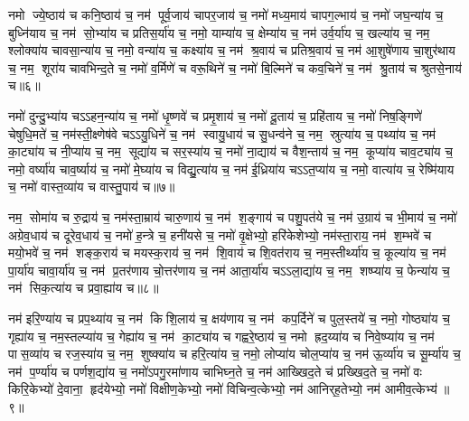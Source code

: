 नमो ज्ये॒ष्ठाय॑ च कनि॒ष्ठाय॑ च॒ नम॑ पूर्व॒जाय॑ चापर॒जाय॑ च॒ नमो॑ मध्य॒माय॑ चापग॒ल्भाय॑ च॒ नमो॑ जघ॒न्या॑य च॒ बुध्नि॑याय च॒ नम॑ सो॒भ्या॑य च प्रतिस॒र्या॑य च॒ नमो॒ याम्या॑य च॒ क्षेम्या॑य च॒ नम॑ उर्व॒र्या॑य च॒ खल्या॑य च॒ नम॒ श्लोक्या॑य चावसा॒न्या॑य च॒ नमो॒ वन्या॑य च॒ कक्ष्या॑य च॒ नम॑ श्र॒वाय॑ च प्रतिश्र॒वाय॑ च॒ नम॑ आ॒शुषे॑णाय चा॒शुर॑थाय च॒ नम॒ शूरा॑य चावभिन्द॒ते च॒ नमो॑ व॒र्मिणे॑ च वरू॒थिने॑ च॒ नमो॑ बि॒ल्मिने॑ च कव॒चिने॑ च॒ नम॑ श्रु॒ताय॑ च श्रुतसे॒नाय॑ च॥६॥ 

नमो॑ दुन्दु॒भ्या॑य चऽऽहन॒न्या॑य च॒ नमो॑ धृ॒ष्णवे॑ च प्रमृ॒शाय॑ च॒ नमो॑ दू॒ताय॑ च॒ प्रहि॑ताय च॒ नमो॑ निष॒ङ्गिणे॑ चेषुधि॒मते॑ च॒ नम॑स्ती॒क्ष्णेष॑वे चऽऽयु॒धिने॑ च॒ नम॑ स्वायु॒धाय॑ च सु॒धन्व॑ने च॒ नम॒ स्रुत्या॑य च॒ पथ्या॑य च॒ नम॑ का॒ट्या॑य च नी॒प्या॑य च॒ नम॒ सूद्या॑य च सर॒स्या॑य च॒ नमो॑ ना॒द्याय॑ च वैश॒न्ताय॑ च॒ नम॒ कूप्या॑य चाव॒ट्या॑य च॒ नमो॒ वर्ष्या॑य चाव॒र्ष्याय॑ च॒ नमो॑ मे॒घ्या॑य च विद्यु॒त्या॑य च॒ नम॑ ई॒ध्रिया॑य चऽऽत॒प्या॑य च॒ नमो॒ वात्या॑य च॒ रेष्मि॑याय च॒ नमो॑ वास्त॒व्या॑य च वास्तु॒पाय॑ च॥७॥ 

नम॒ सोमा॑य च रु॒द्राय॑ च॒ नम॑स्ता॒म्राय॑ चारु॒णाय॑ च॒ नम॑ श॒ङ्गाय॑ च पशु॒पत॑ये च॒ नम॑ उ॒ग्राय॑ च भी॒माय॑ च॒ नमो॑ अग्रेव॒धाय॑ च दूरेव॒धाय॑ च॒ नमो॑ ह॒न्त्रे च॒ हनी॑यसे च॒ नमो॑ वृ॒क्षेभ्यो॒ हरि॑केशेभ्यो॒ नम॑स्ता॒राय॒ नम॑  श॒म्भवे॑ च मयो॒भवे॑ च॒ नम॑ शङ्क॒राय॑ च मयस्क॒राय॑ च॒ नम॑ शि॒वाय॑ च शि॒वत॑राय च॒ नम॒स्तीर्थ्या॑य च॒ कूल्या॑य च॒ नम॑ पा॒र्या॑य चावा॒र्या॑य च॒ नम॑ प्र॒तर॑णाय चो॒त्तर॑णाय च॒ नम॑ आता॒र्या॑य चऽऽला॒द्या॑य च॒ नम॒ शष्प्या॑य च॒ फेन्या॑य च॒ नम॑ सिक॒त्या॑य च प्रवा॒ह्या॑य च॥८॥ 

नम॑ इरि॒ण्या॑य च प्रप॒थ्या॑य च॒ नम॑ किशि॒लाय॑ च॒ क्षय॑णाय च॒ नम॑ कप॒र्दिने॑ च पुल॒स्तये॑ च॒ नमो॒ गोष्ठ्या॑य च॒ गृह्या॑य च॒ नम॒स्तल्प्या॑य च॒ गेह्या॑य च॒ नम॑ का॒ट्या॑य च गह्वरे॒ष्ठाय॑ च॒ नमो ह्रद॒य्या॑य च निवे॒ष्प्या॑य च॒ नम॑ पास॒व्या॑य च रज॒स्या॑य च॒ नम॒ शुष्क्या॑य च हरि॒त्या॑य च॒ नमो॒ लोप्या॑य चोल॒प्या॑य च॒ नम॑ ऊ॒र्व्या॑य च सू॒र्म्या॑य च॒ नम॑ प॒र्ण्या॑य च पर्णश॒द्या॑य च॒ नमो॑ऽपगु॒रमा॑णाय चाभिघ्न॒ते च॒ नम॑ आख्खिद॒ते च॑ प्रख्खिद॒ते च॒ नमो॑ वः किरि॒केभ्यो॑ दे॒वाना॒ हृद॑येभ्यो॒ नमो॑ विक्षीण॒केभ्यो॒ नमो॑ विचिन्व॒त्केभ्यो॒ नम॑ आनिर्‌ह॒तेभ्यो॒ नम॑ आमीव॒त्केभ्य॑॥९॥ 

